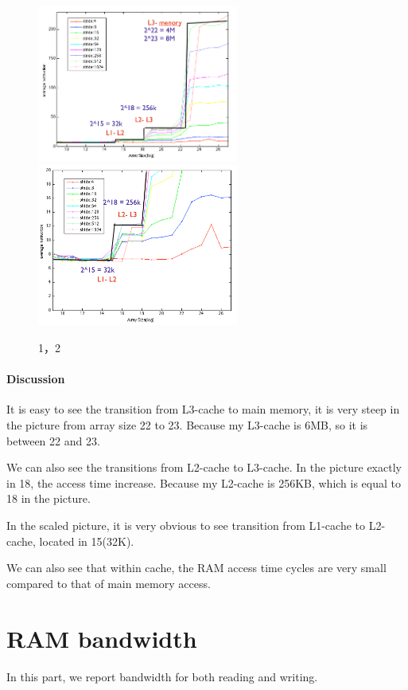 \begin {figure}
\centering
\includegraphics[width=2.6in]{./pics/ram1.png}
\includegraphics[width=2.6in]{./pics/ram2.png}
\caption{1，2}\label{RAM access}
\end{figure}


\paragraph{Discussion}
It is easy to see the transition from L3-cache to main memory, it is very steep in the picture from array size 22 to 23. Because my L3-cache is 6MB, so it is between 22 and 23.

We can also see the transitions from L2-cache to L3-cache. In the picture exactly in 18, the access time increase. Because my L2-cache is 256KB, which is equal to 18 in the picture.

In the scaled picture, it is very obvious to see transition from L1-cache to L2-cache, located in 15(32K).

We can also see that within cache, the RAM access time cycles are very small compared to that of main memory access.



\section{RAM bandwidth}
In this part, we report bandwidth for both reading and writing.

